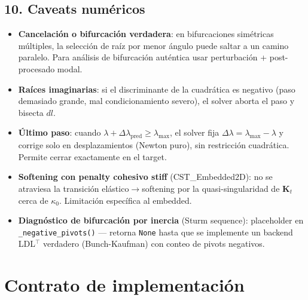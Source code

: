 \documentclass[11pt,letterpaper,oneside]{report}
\begin{document}
\subsection{10. Caveats numéricos}

\begin{itemize}
  \item \textbf{Cancelación o bifurcación verdadera}: en bifurcaciones simétricas múltiples, la selección de raíz por menor ángulo puede saltar a un camino paralelo. Para análisis de bifurcación auténtica usar perturbación + post-procesado modal.
  \item \textbf{Raíces imaginarias}: si el discriminante de la cuadrática es negativo (paso demasiado grande, mal condicionamiento severo), el solver aborta el paso y bisecta $dl$.
  \item \textbf{Último paso}: cuando $\lambda + \Delta\lambda_{\text{pred}} \ge \lambda_{\max}$, el solver fija $\Delta\lambda = \lambda_{\max} - \lambda$ y corrige solo en desplazamientos (Newton puro), sin restricción cuadrática. Permite cerrar exactamente en el target.
  \item \textbf{Softening con penalty cohesivo stiff} (CST\_Embedded2D): no se atraviesa la transición elástico\ensuremath{\to}softening por la quasi-singularidad de $\mathbf K_t$ cerca de $\kappa_0$. Limitación específica al embedded.
  \item \textbf{Diagnóstico de bifurcación por inercia} (Sturm sequence): placeholder en \texttt{\_negative\_pivots()} --- retorna \texttt{None} hasta que se implemente un backend LDL\ensuremath{^{\top}} verdadero (Bunch-Kaufman) con conteo de pivots negativos.
\end{itemize}


\section{Contrato de implementación}
\end{document}
